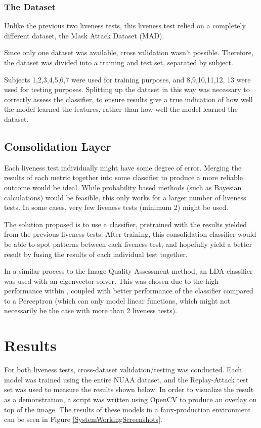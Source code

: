 \documentclass[10pt,a4paper]{article}
\begin{document}
        \subsubsection{The Dataset}
            Unlike the previous two liveness tests, this liveness test relied on a completely different dataset, the Mask Attack Dataset (MAD). \cite{3DMadDataset}

            Since only one dataset was available, cross validation wasn't possible. Therefore, the dataset was divided into a training and test set, separated by subject.

            Subjects 1,2,3,4,5,6,7 were used for training purposes, and 8,9,10,11,12, 13 were used for testing purposes. Splitting up the dataset in this way was necessary to correctly assess the classifier,
            to ensure results give a true indication of how well the model learned the features, rather than how well the model learned the dataset.

    \subsection{Consolidation Layer}
        Each liveness test individually might have some degree of error. Merging the results of each metric together into some classifier to produce a more reliable outcome would be ideal.
        While probability based methods (such as Bayesian calculations) would be feasible, this only works for a larger number of liveness tests. In some cases, very few liveness tests (minimum 2)
        might be used. 

        The solution proposed is to use a classifier, pretrained with the results yielded from the previous liveness tests. After training, this consolidation classifier would be able to spot patterns
        between each liveness test, and hopefully yield a better result by fusing the results of each individual test together. 
        
        In a similar process to the Image Quality Assessment method, an LDA classifier was used with an eigenvector-solver. This was chosen due to the high performance within \cite{ImageQualityAssessmentTest},
        coupled with better performance of the classifier compared to a Perceptron (which can only model linear functions, which might not necessarily be the case with more than 2 liveness tests).
  
\section{Results}
    For both liveness tests, cross-dataset validation/testing was conducted. Each model was trained using the entire NUAA dataset, and the Replay-Attack test set
    was used to measure the results shown below. In order to visualize the result as a demonstration, a script was written using OpenCV to produce an overlay on top of the image.
    The results of these models in a faux-production environment can be seen in Figure \ref{SystemWorkingScreenshots}. 
\end{document}
